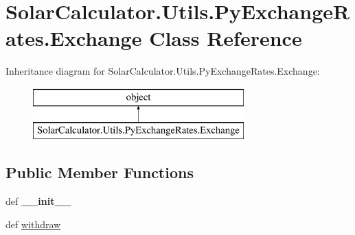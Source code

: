 \hypertarget{class_solar_calculator_1_1_utils_1_1_py_exchange_rates_1_1_exchange}{\section{Solar\-Calculator.\-Utils.\-Py\-Exchange\-Rates.\-Exchange Class Reference}
\label{class_solar_calculator_1_1_utils_1_1_py_exchange_rates_1_1_exchange}
}
Inheritance diagram for Solar\-Calculator.\-Utils.\-Py\-Exchange\-Rates.\-Exchange\-:\begin{figure}[H]
\begin{center}
\leavevmode
\includegraphics[height=2.000000cm]{class_solar_calculator_1_1_utils_1_1_py_exchange_rates_1_1_exchange}
\end{center}
\end{figure}
\subsection*{Public Member Functions}
\begin{DoxyCompactItemize}
\item 
\hypertarget{class_solar_calculator_1_1_utils_1_1_py_exchange_rates_1_1_exchange_a1e2aace47cdbcdb667539fbfda097a4e}{def {\bfseries \-\_\-\-\_\-init\-\_\-\-\_\-}}\label{class_solar_calculator_1_1_utils_1_1_py_exchange_rates_1_1_exchange_a1e2aace47cdbcdb667539fbfda097a4e}

\item 
def \hyperlink{class_solar_calculator_1_1_utils_1_1_py_exchange_rates_1_1_exchange_a3880cd9fcd45f8c9eec5a6587fd22303}{withdraw}
\end{DoxyCompactItemize}
